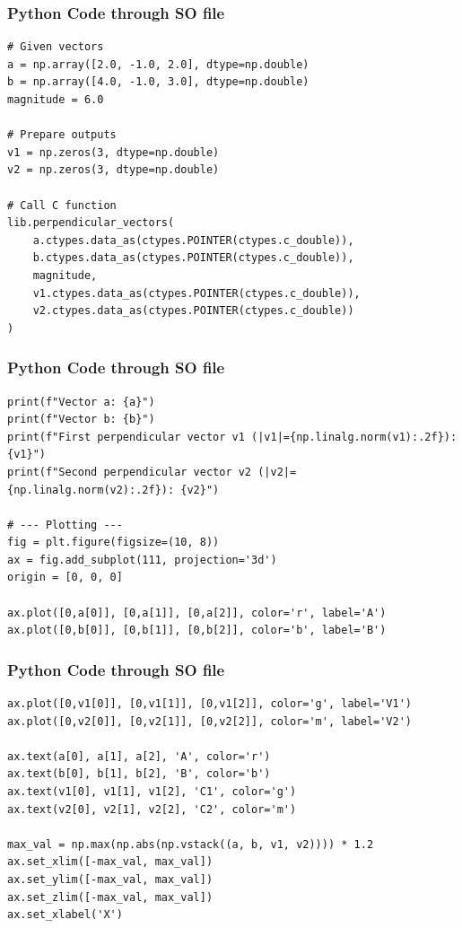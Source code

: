 \documentclass{beamer}
\begin{document}
\begin{frame}[fragile]
\frametitle{Python Code through SO file}
\begin{lstlisting}
# Given vectors
a = np.array([2.0, -1.0, 2.0], dtype=np.double)
b = np.array([4.0, -1.0, 3.0], dtype=np.double)
magnitude = 6.0

# Prepare outputs
v1 = np.zeros(3, dtype=np.double)
v2 = np.zeros(3, dtype=np.double)

# Call C function
lib.perpendicular_vectors(
    a.ctypes.data_as(ctypes.POINTER(ctypes.c_double)),
    b.ctypes.data_as(ctypes.POINTER(ctypes.c_double)),
    magnitude,
    v1.ctypes.data_as(ctypes.POINTER(ctypes.c_double)),
    v2.ctypes.data_as(ctypes.POINTER(ctypes.c_double))
)
\end{lstlisting}
\end{frame}

\begin{frame}[fragile]
\frametitle{Python Code through SO file}
\begin{lstlisting}
print(f"Vector a: {a}")
print(f"Vector b: {b}")
print(f"First perpendicular vector v1 (|v1|={np.linalg.norm(v1):.2f}): {v1}")
print(f"Second perpendicular vector v2 (|v2|={np.linalg.norm(v2):.2f}): {v2}")

# --- Plotting ---
fig = plt.figure(figsize=(10, 8))
ax = fig.add_subplot(111, projection='3d')
origin = [0, 0, 0]

ax.plot([0,a[0]], [0,a[1]], [0,a[2]], color='r', label='A')
ax.plot([0,b[0]], [0,b[1]], [0,b[2]], color='b', label='B')
\end{lstlisting}
\end{frame}

\begin{frame}[fragile]
\frametitle{Python Code through SO file}
\begin{lstlisting}
ax.plot([0,v1[0]], [0,v1[1]], [0,v1[2]], color='g', label='V1')
ax.plot([0,v2[0]], [0,v2[1]], [0,v2[2]], color='m', label='V2')

ax.text(a[0], a[1], a[2], 'A', color='r')
ax.text(b[0], b[1], b[2], 'B', color='b')
ax.text(v1[0], v1[1], v1[2], 'C1', color='g')
ax.text(v2[0], v2[1], v2[2], 'C2', color='m')

max_val = np.max(np.abs(np.vstack((a, b, v1, v2)))) * 1.2
ax.set_xlim([-max_val, max_val])
ax.set_ylim([-max_val, max_val])
ax.set_zlim([-max_val, max_val])
ax.set_xlabel('X')
\end{lstlisting}
\end{frame}
\end{document}

